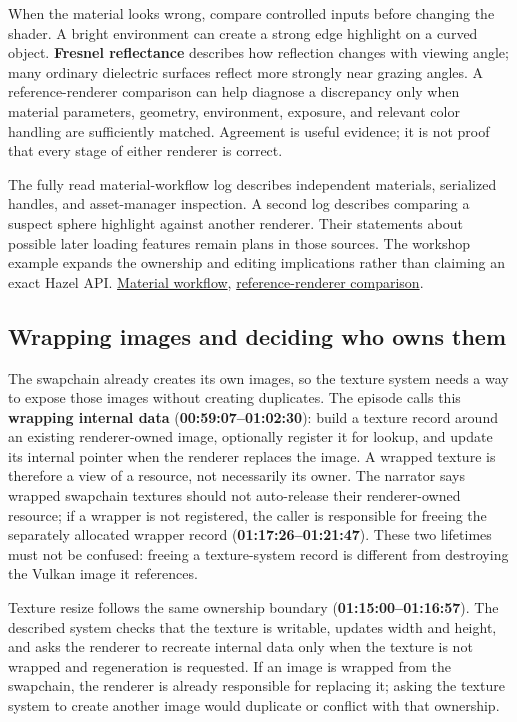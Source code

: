 When the material looks wrong, compare controlled inputs before changing the shader. A bright environment can create a strong edge highlight on a curved object. \textbf{Fresnel reflectance} describes how reflection changes with viewing angle; many ordinary dielectric surfaces reflect more strongly near grazing angles. A reference-renderer comparison can help diagnose a discrepancy only when material parameters, geometry, environment, exposure, and relevant color handling are sufficiently matched. Agreement is useful evidence; it is not proof that every stage of either renderer is correct.

The fully read material-workflow log describes independent materials, serialized handles, and asset-manager inspection. A second log describes comparing a suspect sphere highlight against another renderer. Their statements about possible later loading features remain plans in those sources. The workshop example expands the ownership and editing implications rather than claiming an exact Hazel API. \href{https://www.youtube.com/watch?v=YIpqGPepQAs}{Material workflow}, \href{https://www.youtube.com/watch?v=ZtJ5AYpBgUM}{reference-renderer comparison}.

\subsection{Wrapping images and deciding who owns them}\label{06-engine-ii-ch027-wrapping-images-and-deciding-who-owns-them}

\hypertarget{06-engine-ii-ch027-wrapping-images-and-deciding-who-owns-them}{}

The swapchain already creates its own images, so the texture system needs a way to expose those images without creating duplicates. The episode calls this \textbf{wrapping internal data} (\textbf{00:59:07--01:02:30}): build a texture record around an existing renderer-owned image, optionally register it for lookup, and update its internal pointer when the renderer replaces the image. A wrapped texture is therefore a view of a resource, not necessarily its owner. The narrator says wrapped swapchain textures should not auto-release their renderer-owned resource; if a wrapper is not registered, the caller is responsible for freeing the separately allocated wrapper record (\textbf{01:17:26--01:21:47}). These two lifetimes must not be confused: freeing a texture-system record is different from destroying the Vulkan image it references.

Texture resize follows the same ownership boundary (\textbf{01:15:00--01:16:57}). The described system checks that the texture is writable, updates width and height, and asks the renderer to recreate internal data only when the texture is not wrapped and regeneration is requested. If an image is wrapped from the swapchain, the renderer is already responsible for replacing it; asking the texture system to create another image would duplicate or conflict with that ownership.

